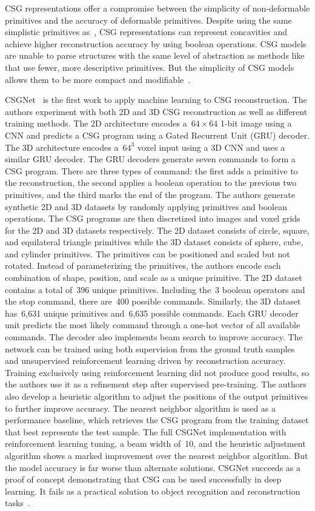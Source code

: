 CSG representations offer a compromise between the simplicity of non-deformable primitives and the accuracy of deformable primitives. Despite using the same simplistic primitives as~\cite{Li2019}, CSG representations can represent concavities and achieve higher reconstruction accuracy by using boolean operations. CSG models are unable to parse structures with the same level of abstraction as methods like~\cite{Paschalidou2021} that use fewer, more descriptive primitives. But the simplicity of CSG models allows them to be more compact and modifiable~\cite{Paschalidou2021}.

CSGNet~\cite{Sharma2018} is the first work to apply machine learning to CSG reconstruction. The authors experiment with both 2D and 3D CSG reconstruction as well as different training methods. The 2D architecture encodes a~$64 \times 64$ 1-bit image using a CNN and predicts a CSG program using a Gated Recurrent Unit (GRU) decoder. The 3D architecture encodes a~$64^3$ voxel input using a 3D CNN and uses a similar GRU decoder. The GRU decoders generate seven commands to form a CSG program. There are three types of command: the first adds a primitive to the reconstruction, the second applies a boolean operation to the previous two primitives, and the third marks the end of the program. The authors generate synthetic 2D and 3D datasets by randomly applying primitives and boolean operations. The CSG programs are then discretized into images and voxel grids for the 2D and 3D datasets respectively. The 2D dataset consists of circle, square, and equilateral triangle primitives while the 3D dataset consists of sphere, cube, and cylinder primitives. The primitives can be positioned and scaled but not rotated. Instead of parameterizing the primitives, the authors encode each combination of shape, position, and scale as a unique primitive. The 2D dataset contains a total of~396 unique primitives. Including the~3 boolean operators and the stop command, there are~400 possible commands. Similarly, the 3D dataset has~6,631 unique primitives and~6,635 possible commands. Each GRU decoder unit predicts the most likely command through a one-hot vector of all available commands. The decoder also implements beam search to improve accuracy. The network can be trained using both supervision from the ground truth samples and unsupervised reinforcement learning driven by reconstruction accuracy. Training exclusively using reinforcement learning did not produce good results, so the authors use it as a refinement step after supervised pre-training. The authors also develop a heuristic algorithm to adjust the positions of the output primitives to further improve accuracy. The nearest neighbor algorithm is used as a performance baseline, which retrieves the CSG program from the training dataset that best represents the test sample. The full CSGNet implementation with reinforcement learning tuning, a beam width of~10, and the heuristic adjustment algorithm shows a marked improvement over the nearest neighbor algorithm. But the model accuracy is far worse than alternate solutions. CSGNet succeeds as a proof of concept demonstrating that CSG can be used successfully in deep learning. It fails as a practical solution to object recognition and reconstruction tasks~\cite{Sharma2018}.


